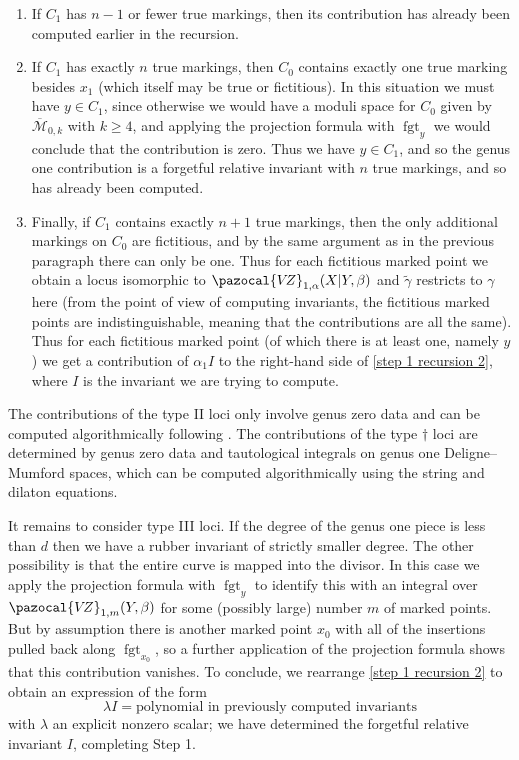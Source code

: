 \documentclass[11pt]{amsart}
\newcommand{\VZ}{\pazocal{V\!Z}}
\newcommand{\fgt}{\operatorname{fgt}}
\newcommand{\Mcal}{\mathcal{M}}
\newcommand{\ol}[1]{\overline{#1}}
\theoremstyle{definition}
\theoremstyle{definition}
\begin{document}
\begin{enumerate}
\item If $C_1$ has $n-1$ or fewer true markings, then its contribution has already been computed earlier in the recursion.
\item If $C_1$ has exactly $n$ true markings, then $C_0$ contains exactly one true marking besides $x_1$ (which itself may be true or fictitious). In this situation we must have $y \in C_1$, since otherwise we would have a moduli space for $C_0$ given by $\ol\Mcal_{0,k}$ with $k \geq 4$, and applying the projection formula with $\fgt_y$ we would conclude that the contribution is zero. Thus we have $y \in C_1$, and so the genus one contribution is a forgetful relative invariant with $n$ true markings, and so has already been computed.
\item Finally, if $C_1$ contains exactly $n+1$ true markings, then the only additional markings on $C_0$ are fictitious, and by the same argument as in the previous paragraph there can only be one. Thus for each fictitious marked point we obtain a locus isomorphic to $\VZ_{1,\alpha}(X|Y,\beta)$ and $\tilde\gamma$ restricts to $\gamma$ here (from the point of view of computing invariants, the fictitious marked points are indistinguishable, meaning that the contributions are all the same). Thus for each fictitious marked point (of which there is at least one, namely $y$) we get a contribution of $\alpha_1 I$ to the right-hand side of \eqref{step 1 recursion 2}, where $I$ is the invariant we are trying to compute.
\end{enumerate}\medskip
The contributions of the type II loci only involve genus zero data and can be computed algorithmically following \cite{Ga}. The contributions of the type $\dag$ loci are determined by genus zero data and tautological integrals on genus one Deligne--Mumford spaces, which can be computed algorithmically using the string and dilaton equations.

It remains to consider type III loci. If the degree of the genus one piece is less than $d$ then we have a rubber invariant of strictly smaller degree. The other possibility is that the entire curve is mapped into the divisor. In this case we apply the projection formula with $\fgt_y$ to identify this with an integral over $\VZ_{1,m}(Y,\beta)$ for some (possibly large) number $m$ of marked points. But by assumption there is another marked point $x_0$ with all of the insertions pulled back along $\fgt_{x_0}$, so a further application of the projection formula shows that this contribution vanishes. To conclude, we rearrange \eqref{step 1 recursion 2} to obtain an expression of the form
\begin{equation*} \lambda I = \text{polynomial in previously computed invariants} \end{equation*}
with $\lambda$ an explicit nonzero scalar; we have determined the forgetful relative invariant $I$, completing Step 1.
\end{document}
